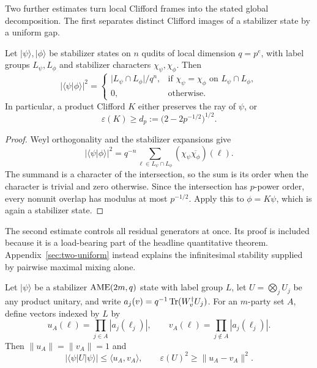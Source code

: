 Two further estimates turn local Clifford frames into the stated global
decomposition.  The first separates distinct Clifford images of a stabilizer
state by a uniform gap.

\begin{lemma}
\label{lem:stabilizer-overlap-gap}
Let \(\lvert\psi\rangle,\lvert\phi\rangle\) be stabilizer states on \(n\)
qudits of local dimension \(q=p^e\), with label groups
\(L_\psi,L_\phi\) and stabilizer characters \(\chi_\psi,\chi_\phi\).  Then
\[
 \lvert\langle\psi\vert\phi\rangle\rvert^2=
 \begin{cases}
  \lvert L_\psi\cap L_\phi\rvert/q^n,
   &\text{if \(\chi_\psi=\chi_\phi\) on \(L_\psi\cap L_\phi\)},\\
  0,&\text{otherwise.}
 \end{cases}
\]
In particular, a product Clifford \(K\) either preserves the ray of
\(\psi\), or
\[
 \varepsilon(K)\geq d_p:=\bigl(2-2p^{-1/2}\bigr)^{1/2}.
\]
\end{lemma}

\begin{proof}
Weyl orthogonality and the stabilizer expansions give
\[
 \lvert\langle\psi\vert\phi\rangle\rvert^2
 =q^{-n}\sum_{\ell\in L_\psi\cap L_\phi}
   (\chi_\psi\overline{\chi_\phi})(\ell).
\]
The summand is a character of the intersection, so the sum is its order when
the character is trivial and zero otherwise.  Since the intersection has
\(p\)-power order, every nonunit overlap has modulus at most \(p^{-1/2}\).
Apply this to \(\phi=K\psi\), which is again a stabilizer state.
\end{proof}

The second estimate controls all residual generators at once.  Its proof is
included because it is a load-bearing part of the headline quantitative
theorem.  Appendix~\ref{sec:two-uniform} instead explains the infinitesimal
stability supplied by pairwise maximal mixing alone.

\begin{lemma}
\label{lem:balanced-cut-comparison}
Let \(\lvert\psi\rangle\) be a stabilizer \(\mathrm{AME}(2m,q)\) state with label
group \(L\), let \(U=\bigotimes_jU_j\) be any product unitary, and write
\(a_j(v)=q^{-1}\operatorname{Tr}(W_v^\dagger U_j)\).  For an \(m\)-party set \(A\), define
vectors indexed by \(L\) by
\[
 u_A(\ell)=\prod_{j\in A}|a_j(\ell_j)|,
 \qquad
 v_A(\ell)=\prod_{j\notin A}|a_j(\ell_j)|.
\]
Then \(\lVert u_A\rVert=\lVert v_A\rVert=1\) and
\[
 |\langle\psi|U|\psi\rangle|\leq\langle u_A,v_A\rangle,
 \qquad
 \varepsilon(U)^2\geq\lVert u_A-v_A\rVert^2.
\]
\end{lemma}

